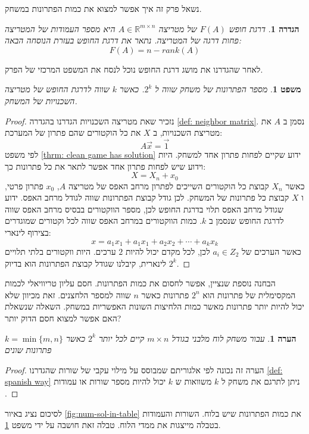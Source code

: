 \documentclass[12pt,leqno]{article}
\theoremstyle{theoremdd}
\newtheorem{definition}{הגדרה}[section]
\newtheorem{theorem}{משפט}[section]
\newtheorem{comm}{הערה}[section]
\begin{document}
נשאל פרק זה איך אפשר למצוא את כמות הפתרונות במשחק.
\begin{definition}
    דרגת חופש
    $F(A)$
    של מטריצה 
    $A \in\mathbb{R}^{m \times n}$
    היא מספר העמודות 
    של המטריצה פחות דרגה של המטריצה.
    נתאר את דרגת החופש
    בעזרת הנוסחה הבאה:
    \[
        F(A) = n - rank(A)
    \]
\end{definition}
לאחר שהגדרנו את מושג דרגת החופש נוכל לנסח את המשפט המרכזי של הפרק.
\begin{theorem}
    \label{thm:calc-num-sol}
    מספר הפתרונות של משחק 
    שווה ל 
    $2^{k}$.
    כאשר 
    $k$
    שווה לדרגת החופש של מטריצה
    השכנויות של המשחק.
\end{theorem}
\begin{proof}
    נזכיר שאת מטריצה השכנויות הגדרנו בהגדרה
    \ref{def: neighbor matrix}.
    נסמן ב
    $A$
    את מטריצת השכנויות,
    ב
    $X$
    את כל הוקטורים שהם פתרון של המערכת:
    \[A \vec x = \vec{1}\]
    לפי משפט 
    \ref{thrm: clean game has solution}
    ידוע שקיים לפחות פתרון אחד למשחק.
    היות וידוע שיש לפחות פתרון אחד אפשר לתאר את כל פתרונות כך:
    \[X = X_n + x_0\]
    כאשר 
    $X_n$
    קבוצת כל הוקטורים השייכים לפתרון מרחב האפס 
    של מטריצה 
    $A$,
    $x_0$ 
    פתרון פרטי,  
    ו
    $X$
    קבוצת
    כל פתרונות של המשחק.
    לכן גודל קבוצת הפתרונות שווה לגודל מרחב האפס.
    ידוע שגודל מרחב האפס תלוי בדרגת החופש לכן, מספר הווקטורים בבסיס
    מרחב האפס שווה לדרגת החופש שנסמן ב
    $k$.
    כמות הווקטורים במרחב האפס שווה לכל וקטורים שמוגדרים בצירוף לינארי:
    \[x = a_1 x_1 + a_1 x_1 + a_2 x_2 + \cdots + a_k x_k\]
    כאשר הערכים של
    $a_i \in Z_2$
    לכן,
    לכל מקדם יכול להיות
    $2$
    ערכים.
    היות ווקטורים בלתי תלויים לינארית,
    קיבלנו שגודל קבוצת הפתרונות הוא בדיוק
    $2^k$.
\end{proof}
הבחנה נוספת שנציין, אפשר לחסום את כמות הפתרונות.
חסם עליון טריוויאלי לכמות המקסימלית של פתרונות הוא 
$2^n$
פתרונות כאשר
$n$
שווה למספר הלחצנים.
זאת מכיוון שלא יכול להיות יותר פתרונות מאשר כמות הלחיצות השונות האפשריות במשחק.
השאלה שנשאלת האם אפשר למצוא חסם הדוק יותר?
\begin{comm}
    עבור משחק לוח מלבני
    בגודל 
    $m \times n$
    קיים לכל יותר 
    $2^k$
    כאשר 
    $k = \min\{m,n\}$
    פתרונות שונים
\end{comm}
\begin{proof}
    הערה זה נכונה לפי אלגוריתם שמבוסס על מילוי עקבי של שורות
שהגדרנו
\ref{def: spanish way}
ניתן לתרגם את משחק ל
$k$
משוואות 
ש
$k$
יכול להיות מספר שורות או עמודות 
.
\end{proof}
לסיכום 
נציג באיור 
\ref{fig:num-sol-in-table}
את כמות הפתרונות שיש בלוח.
השורות והעמודות בטבלה מייצגות את ממדי הלוח.
טבלה זאת חושבה על ידי משפט 
\ref{thm:calc-num-sol}.
\end{document}
